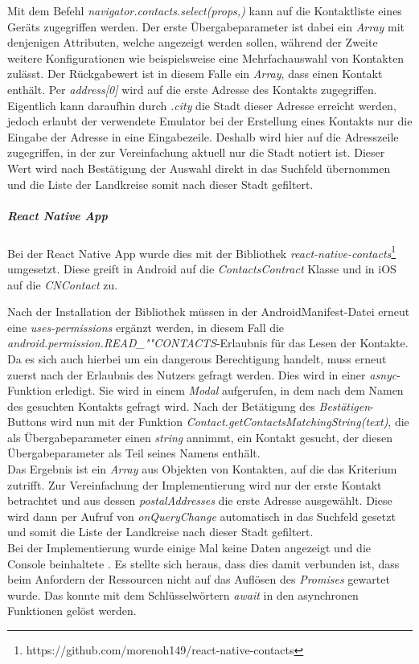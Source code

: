 Mit dem Befehl \textit{navigator.contacts.select(props,{})} kann auf die Kontaktliste eines Geräts zugegriffen werden.
Der erste Übergabeparameter ist dabei ein \textit{Array} mit denjenigen Attributen, welche angezeigt werden sollen, während der Zweite weitere Konfigurationen wie beispielsweise eine Mehrfachauswahl von Kontakten zulässt.
Der Rückgabewert ist in diesem Falle ein \textit{Array}, dass einen Kontakt enthält.
Per \textit{address[0]} wird auf die erste Adresse des Kontakts zugegriffen.
Eigentlich kann daraufhin durch \textit{.city} die Stadt dieser Adresse erreicht werden, jedoch erlaubt der verwendete Emulator bei der Erstellung eines Kontakts nur die Eingabe der Adresse in eine Eingabezeile.
Deshalb wird hier auf die Adresszeile zugegriffen, in der zur Vereinfachung aktuell nur die Stadt notiert ist.
Dieser Wert wird nach Bestätigung der Auswahl direkt in das Suchfeld übernommen und die Liste der Landkreise somit nach dieser Stadt gefiltert.

\subparagraph{React Native App\\}
Bei der React Native App wurde dies mit der Bibliothek \textit{react-native-contacts}\footnote{https://github.com/morenoh149/react-native-contacts} umgesetzt.
Diese greift in Android auf die \textit{ContactsContract} Klasse und in iOS auf die \textit{CNContact} zu.

Nach der Installation der Bibliothek müssen in der AndroidManifest-Datei erneut eine \textit{uses-permissions} ergänzt werden, in diesem Fall die \textit{android.permission.READ\_""CONTACTS}-Erlaubnis für das Lesen der Kontakte.
Da es sich auch hierbei um ein \glqq dangerous\grqq{} Berechtigung handelt, muss erneut zuerst nach der Erlaubnis des Nutzers gefragt werden.
Dies wird in einer \textit{asnyc}-Funktion erledigt.
Sie wird in einem \textit{Modal} aufgerufen, in dem nach dem Namen des gesuchten Kontakts gefragt wird.
Nach der Betätigung des \textit{Bestätigen}-Buttons wird nun mit der Funktion \textit{Contact.getContactsMatchingString(text)}, die als Übergabeparameter einen \textit{string} annimmt, ein Kontakt gesucht, der diesen Übergabeparameter als Teil seines Namens enthält.\\
Das Ergebnis ist ein \textit{Array} aus Objekten von Kontakten, auf die das Kriterium zutrifft.
Zur Vereinfachung der Implementierung wird nur der erste Kontakt betrachtet und aus dessen \textit{postalAddresses} die erste Adresse ausgewählt.
Diese wird dann per Aufruf von \textit{onQueryChange} automatisch in das Suchfeld gesetzt und somit die Liste der Landkreise nach dieser Stadt gefiltert.\\
Bei der Implementierung wurde einige Mal keine Daten angezeigt und die Console beinhaltete \grqq{}.
Es stellte sich heraus, dass dies damit verbunden ist, dass beim Anfordern der Ressourcen nicht auf das Auflösen des \textit{Promises} gewartet wurde.
Das konnte mit dem Schlüsselwörtern \textit{await} in den asynchronen Funktionen gelöst werden.


